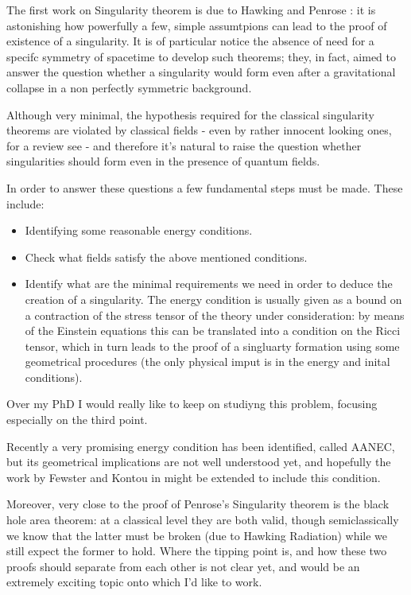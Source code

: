 \documentclass[12pt, a4paper]{article}
\begin{document}
The first work on Singularity theorem is due to Hawking \cite{hawking1966occurrence} and Penrose \cite{penrose1965gravitational}: it is astonishing how powerfully a few, simple assumtpions can lead to the proof of existence of a singularity.
It is of particular notice the absence of need for a specifc symmetry of spacetime to develop such theorems; they, in fact, aimed to answer the question whether a singularity would form even after a gravitational collapse in a non perfectly symmetric background. 

Although very minimal, the hypothesis required for the classical singularity theorems are violated by classical fields - even by rather innocent looking ones, for a review see \cite{kontou2020energy} - and therefore it's natural to raise the question whether singularities should form even in the presence of quantum fields.

In order to answer these questions a few fundamental steps must be made. These include:
\begin{itemize}
	\item Identifying some reasonable energy conditions.
	\item Check what fields satisfy the above mentioned conditions.
	\item Identify what are the minimal requirements we need in order to deduce the creation of a singularity. 
	The energy condition is usually given as a bound on a contraction of the stress tensor of the theory under consideration: by means of the Einstein equations this can be translated into a condition on the Ricci tensor, which in turn leads to the proof of a singluarty formation using some geometrical procedures (the only physical imput is in the energy and inital conditions).
\end{itemize}

Over my PhD I would really like to keep on studiyng this problem, focusing especially on the third point. 

Recently a very promising energy condition has been identified, called AANEC, but its geometrical implications are not well understood yet, and hopefully the work by Fewster and Kontou in \cite{fewster2020new} might be extended to include this condition.

Moreover, very close to the proof of Penrose's Singularity theorem is the black hole area theorem: at a classical level they are both valid, though semiclassically we know that the latter must be broken (due to Hawking Radiation) while we still expect the former to hold. Where the tipping point is, and how these two proofs should separate from each other is not clear yet, and would be an extremely exciting topic onto which I'd like to work.
\end{document}
